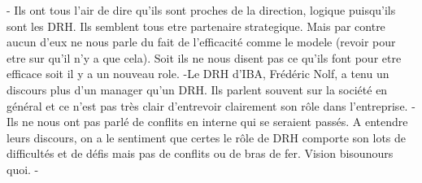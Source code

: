 
- Ils ont tous l'air de dire qu'ils sont proches de la direction, logique puisqu'ils sont les DRH. Ils semblent tous etre partenaire strategique. Mais par contre aucun d'eux ne nous parle du fait de l'efficacité comme le modele (revoir pour etre sur qu'il n'y a que cela). Soit ils ne nous disent pas ce qu'ils font pour etre efficace soit il y a un nouveau role. 
-Le DRH d'IBA, Frédéric Nolf, a tenu un discours plus d'un manager qu'un DRH. Ils parlent souvent sur la société en général et ce n'est pas très clair d'entrevoir clairement son rôle dans l'entreprise.
-Ils ne nous ont pas parlé de conflits en interne qui se seraient passés. A entendre leurs discours, on a le sentiment que certes le rôle de DRH comporte son lots de difficultés et de défis mais pas de conflits ou de bras de fer. Vision bisounours quoi.
-